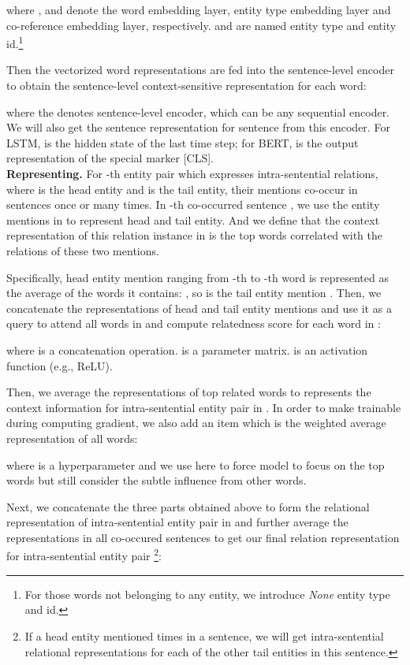 \documentclass[11pt,a4paper]{article}
\begin{document}
where  ,  and  denote the word embedding layer, entity type embedding layer and co-reference embedding layer, respectively.  and  are named entity type and entity id.\footnote{For those words not belonging to any entity, we introduce \textit{None} entity type and id.}

Then the vectorized word representations are fed into the sentence-level encoder to obtain the sentence-level context-sensitive representation for each word:

where the  denotes sentence-level encoder, which can be any sequential encoder. We will also get the sentence representation  for sentence  from this encoder. For LSTM,  is the hidden state of the last time step; for BERT,  is the output representation of the special marker [CLS]. \\
\noindent
\textbf{Representing.} For -th entity pair  which expresses intra-sentential relations, where  is the head entity and  is the tail entity, their mentions co-occur in  sentences  once or many times. 
In -th co-occurred sentence , we use the entity mentions in  to represent head and tail entity. And we define that the context representation of this relation instance in  is the top  words correlated with the relations of these two mentions.

Specifically, head entity mention ranging from -th to -th word is represented as the average of the words it contains: , so is the tail entity mention . 
Then, we concatenate the representations of head and tail entity mentions and use it as a query to attend all words in  and compute relatedness score for each word in  :


where  is a concatenation operation.  is a parameter matrix.  is an activation function (e.g., ReLU).

Then, we average the representations of top  related words to represents the context information  for intra-sentential entity pair  in . In order to make  trainable during computing gradient, we also add an item which is the weighted average representation of all words:

where  is a hyperparameter and we use  here to force model to focus on the top  words but still consider the subtle influence from other words.

Next, we concatenate the three parts obtained above to form the relational representation of intra-sentential entity pair  in  and further average the representations in all co-occured sentences  to get our final relation representation  for intra-sentential entity pair  \footnote{If a head entity mentioned  times in a sentence, we will get  intra-sentential relational representations for each of the other tail entities in this sentence.}:
\end{document}
